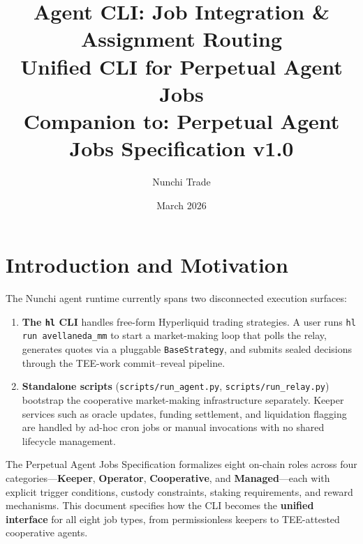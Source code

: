 \documentclass[11pt,a4paper]{article}
\title{\textbf{Agent CLI: Job Integration \& Assignment Routing}\\[0.5em]
\large Unified CLI for Perpetual Agent Jobs\\[0.3em]
\small Companion to: Perpetual Agent Jobs Specification v1.0}
\author{Nunchi Trade}
\date{March 2026}
\begin{document}
\maketitle

\begin{center}
\end{center}

\tableofcontents
\newpage

\section{Introduction and Motivation}

The Nunchi agent runtime currently spans two disconnected execution surfaces:

\begin{enumerate}[leftmargin=2em]
  \item \textbf{The \texttt{hl} CLI} handles free-form Hyperliquid trading strategies.
        A user runs \texttt{hl run avellaneda\_mm} to start a market-making loop that
        polls the relay, generates quotes via a pluggable \texttt{BaseStrategy}, and
        submits sealed decisions through the TEE-work commit--reveal pipeline.
  \item \textbf{Standalone scripts} (\texttt{scripts/run\_agent.py},
        \texttt{scripts/run\_relay.py}) bootstrap the cooperative market-making
        infrastructure separately. Keeper services such as oracle updates, funding
        settlement, and liquidation flagging are handled by ad-hoc cron jobs or
        manual invocations with no shared lifecycle management.
\end{enumerate}

The Perpetual Agent Jobs Specification formalizes eight on-chain roles across four
categories---\textcolor{keeper}{\textbf{Keeper}}, \textcolor{operator}{\textbf{Operator}},
\textcolor{cooperative}{\textbf{Cooperative}}, and \textcolor{managed}{\textbf{Managed}}---each
with explicit trigger conditions, custody constraints, staking requirements, and
reward mechanisms. This document specifies how the CLI becomes the \textbf{unified
interface} for all eight job types, from permissionless keepers to TEE-attested
cooperative agents.
\end{document}
